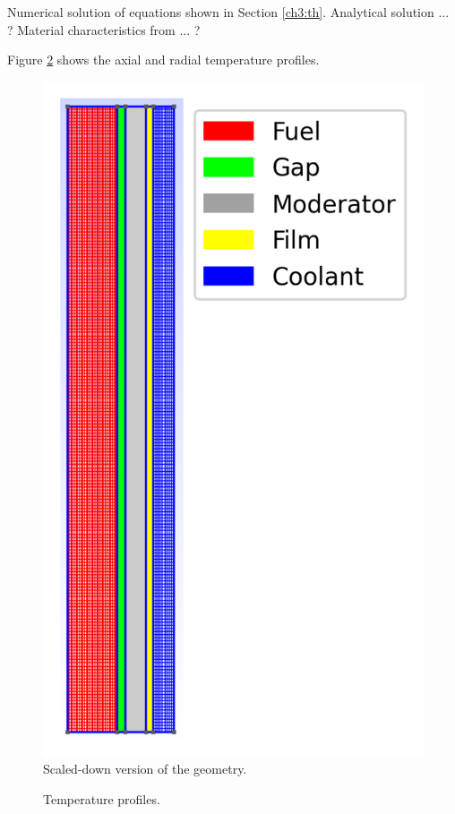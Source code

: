 Numerical solution of equations shown in Section \ref{ch3:th}.
Analytical solution ... ?
Material characteristics from ... ?

Figure \ref{fig:th-ver-results} shows the axial and radial temperature profiles.

\begin{figure}[htbp!]
	\centering
	\includegraphics[width=0.35\linewidth]{figures-thermal/2D-preliminar-mesh2}
	\hfill
	\caption{Scaled-down version of the geometry.}
	\label{fig:th-ver-mesh}
\end{figure}

\begin{figure}[htbp!]
	\centering
	\hfill
    \caption{Temperature profiles.}
	\label{fig:th-ver-results}
\end{figure}

